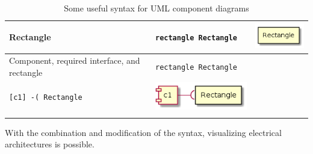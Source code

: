 \begin{longtable}{>{\centering}m{1.8in} >{\centering}m{2in} >{\centering\arraybackslash}m{1.5in}}
Rectangle & \texttt{rectangle Rectangle} & \includegraphics[width=0.5\linewidth]{figure/plantuml_example/rectangle.png}\\ \hline
Component, required interface, and rectangle & \texttt{rectangle Rectangle} \\ \texttt{[c1] -( Rectangle} & \includegraphics[width=0.8\linewidth]{figure/plantuml_example/component_rectangle.png}\\
\bottomrule
\caption{Some useful syntax for UML component diagrams}
\label{table:plantuml_component_syntax}
\end{longtable}

With the combination and modification of the syntax, visualizing electrical architectures is possible.
